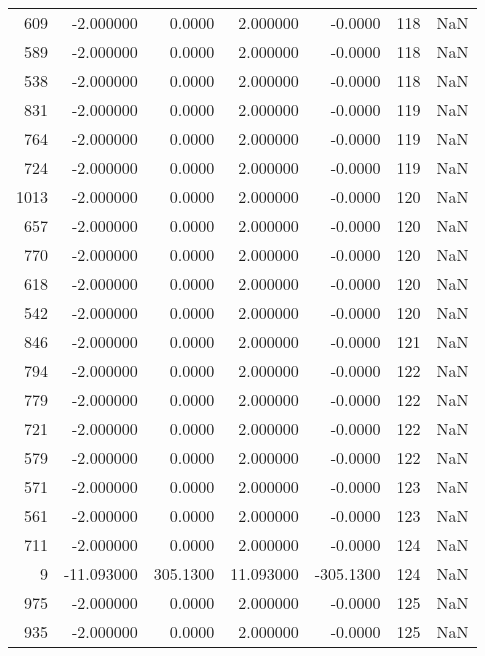 \begin{tabular}{rrrrrrr}
 609 &   -2.000000 &    0.0000 &    2.000000 &     -0.0000 &         118 & NaN \\
 589 &   -2.000000 &    0.0000 &    2.000000 &     -0.0000 &         118 & NaN \\
 538 &   -2.000000 &    0.0000 &    2.000000 &     -0.0000 &         118 & NaN \\
 831 &   -2.000000 &    0.0000 &    2.000000 &     -0.0000 &         119 & NaN \\
 764 &   -2.000000 &    0.0000 &    2.000000 &     -0.0000 &         119 & NaN \\
 724 &   -2.000000 &    0.0000 &    2.000000 &     -0.0000 &         119 & NaN \\
1013 &   -2.000000 &    0.0000 &    2.000000 &     -0.0000 &         120 & NaN \\
 657 &   -2.000000 &    0.0000 &    2.000000 &     -0.0000 &         120 & NaN \\
 770 &   -2.000000 &    0.0000 &    2.000000 &     -0.0000 &         120 & NaN \\
 618 &   -2.000000 &    0.0000 &    2.000000 &     -0.0000 &         120 & NaN \\
 542 &   -2.000000 &    0.0000 &    2.000000 &     -0.0000 &         120 & NaN \\
 846 &   -2.000000 &    0.0000 &    2.000000 &     -0.0000 &         121 & NaN \\
 794 &   -2.000000 &    0.0000 &    2.000000 &     -0.0000 &         122 & NaN \\
 779 &   -2.000000 &    0.0000 &    2.000000 &     -0.0000 &         122 & NaN \\
 721 &   -2.000000 &    0.0000 &    2.000000 &     -0.0000 &         122 & NaN \\
 579 &   -2.000000 &    0.0000 &    2.000000 &     -0.0000 &         122 & NaN \\
 571 &   -2.000000 &    0.0000 &    2.000000 &     -0.0000 &         123 & NaN \\
 561 &   -2.000000 &    0.0000 &    2.000000 &     -0.0000 &         123 & NaN \\
 711 &   -2.000000 &    0.0000 &    2.000000 &     -0.0000 &         124 & NaN \\
   9 &  -11.093000 &  305.1300 &   11.093000 &   -305.1300 &         124 & NaN \\
 975 &   -2.000000 &    0.0000 &    2.000000 &     -0.0000 &         125 & NaN \\
 935 &   -2.000000 &    0.0000 &    2.000000 &     -0.0000 &         125 & NaN \\

\end{tabular}
